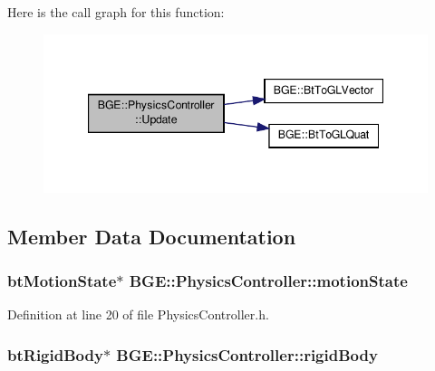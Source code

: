 Here is the call graph for this function\-:
\nopagebreak
\begin{figure}[H]
\begin{center}
\leavevmode
\includegraphics[width=344pt]{class_b_g_e_1_1_physics_controller_a1c49abb1bbcd5002b81b2176a41278f0_cgraph}
\end{center}
\end{figure}




\subsection{Member Data Documentation}
\hypertarget{class_b_g_e_1_1_physics_controller_a2aaedaba9d70aa1d328105c4cdf0b13c}{
\subsubsection[{motion\-State}]{\setlength{\rightskip}{0pt plus 5cm}bt\-Motion\-State$\ast$ B\-G\-E\-::\-Physics\-Controller\-::motion\-State}}\label{class_b_g_e_1_1_physics_controller_a2aaedaba9d70aa1d328105c4cdf0b13c}


Definition at line 20 of file Physics\-Controller.\-h.

\hypertarget{class_b_g_e_1_1_physics_controller_a8987f42fe8e3fd87e15f0105ee4b9936}{
\subsubsection[{rigid\-Body}]{\setlength{\rightskip}{0pt plus 5cm}bt\-Rigid\-Body$\ast$ B\-G\-E\-::\-Physics\-Controller\-::rigid\-Body}}\label{class_b_g_e_1_1_physics_controller_a8987f42fe8e3fd87e15f0105ee4b9936}


